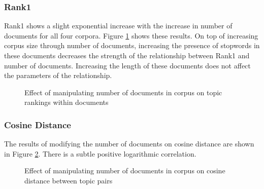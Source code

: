 \documentclass[letterpaper, 10 pt, conference]{ieeeconf}  %
\begin{document}
\subsubsection{Rank1} Rank1 shows a slight exponential increase with the increase in number of documents for all four corpora. Figure \ref{fig:nd_rank1} shows these results. On top of increasing corpus size through number of documents, increasing the presence of stopwords in these documents decreases the strength of the relationship between Rank1 and number of documents. Increasing the length of these documents does not affect the parameters of the relationship.
\begin{figure}[thpb]
      \centering
      \caption{Effect of manipulating number of documents in corpus on topic rankings within documents}
      \label{fig:nd_rank1}
\end{figure}

\subsubsection{Cosine Distance} The results of modifying the number of documents on cosine distance are shown in Figure \ref{fig:nd_cos}. There is a subtle positive logarithmic correlation.
\begin{figure}[thpb]
      \centering
      \caption{Effect of manipulating number of documents in corpus on cosine distance between topic pairs}
      \label{fig:nd_cos}
\end{figure}
\end{document}
